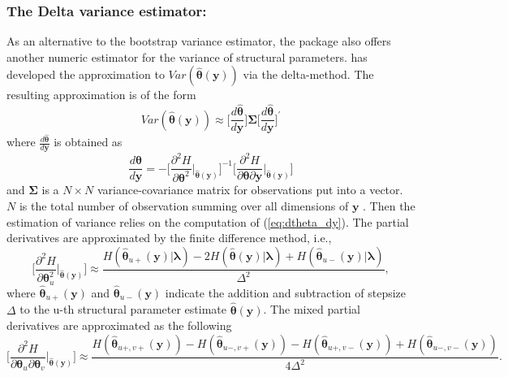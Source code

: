 \subsubsection[deltavar]{The Delta variance estimator: }
As an alternative to the bootstrap variance estimator, the package  also offers another numeric estimator for the variance of structural parameters. \cite{parcascade} has developed the approximation to $Var(\bm{\hat{\theta}}(\bm{y}))$ via the delta-method. The resulting approximation is of the form 
\begin{equation*}
Var(\hat{\bm{\theta}}(\bm{y})) \approx \bigg[ \frac{d\bm{\hat{\theta}}}{d\bm{y}} \bigg] \bm{\Sigma}  \bigg[ \frac{d\bm{\hat{\theta}}}{d\bm{y}} \bigg]^{\prime}
\end{equation*} 
where $\frac{d\bm{\hat{\theta}}}{d\bm{y}}$ is obtained as 
\begin{equation}
  \label{eq:dtheta_dy}
 \frac{d\bm{\hat{\theta}}}{d\bm{y}} = - \bigg[\frac{\partial^{2}H}{\partial\bm{\theta}^2}\bigg\vert_{\bm{\hat{\theta}}(\bm{y})} \bigg]^{-1} \bigg[  \frac{\partial^{2}H}{\partial\bm{\theta}\partial\bm{y}}\bigg\vert_{\bm{\hat{\theta}}(\bm{y})} \bigg]
\end{equation}
and $\bm{\Sigma}$ is a $N \times N$ variance-covariance matrix for observations put into a vector. $N$ is the total number of observation summing over all dimensions of $\bm{y}$
. Then the estimation of variance relies on the computation of (\ref{eq:dtheta_dy}). The partial derivatives are approximated by the finite difference method, i.e., 
\begin{equation*}
\bigg[\frac{\partial^{2}H}{\partial\bm{\theta}_{u}^2}\bigg\vert_{\bm{\hat{\theta}}(\bm{y})} \bigg] \approx \frac{H(\hat{\bm{\theta}}_{u+}(\bm{y})|\bm{\lambda}) - 2H(\hat{\bm{\theta}}(\bm{y})|\bm{\lambda}) + H(\hat{\bm{\theta}}_{u-}(\bm{y})|\bm{\lambda})}{\Delta^{2}},
\end{equation*}
where $\hat{\bm{\theta}}_{u+}(\bm{y})$ and $\hat{\bm{\theta}}_{u-}(\bm{y})$ indicate the addition and subtraction of stepsize $\Delta$ to the u-th structural parameter estimate $\hat{\bm{\theta}}(\bm{y})$. The mixed partial derivatives are approximated as the following
\begin{equation*}
\bigg[\frac{\partial^{2}H}{\partial\bm{\theta}_{u}\partial\bm{\theta}_{v}}\bigg\vert_{\bm{\hat{\theta}}(\bm{y})} \bigg] \approx \frac{H(\hat{\bm{\theta}}_{u+,v+}(\bm{y})) - H(\hat{\bm{\theta}}_{u-,v+}(\bm{y})) - H(\hat{\bm{\theta}}_{u+,v-}(\bm{y})) +H(\hat{\bm{\theta}}_{u-,v-}(\bm{y}))}{4\Delta^{2}}.
\end{equation*}
